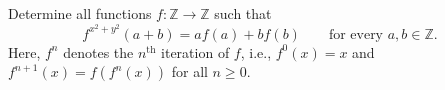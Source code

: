 Determine all functions $f \colon \mathbb{Z} \to \mathbb{Z}$ such that
\[
f^{x^2+y^2}(a+b) = af(a) + bf(b) \qquad \text{for every } a, b \in \mathbb{Z}.
\]
Here, $f^n$ denotes the $n^{\text{th}}$ iteration of $f$, i.e., $f^0(x) = x$ and $f^{n+1}(x) = f(f^n(x))$ for all $n \geqslant 0$.
